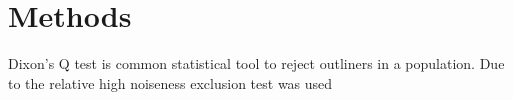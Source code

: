 \chapter{Methods}

Dixon's Q test is common statistical tool to reject outliners in a population. Due to the relative high noiseness  exclusion test was used 